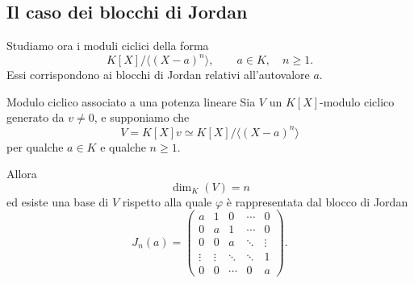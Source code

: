 \documentclass[a4paper]{article}
\begin{document}
\subsection{Il caso dei blocchi di Jordan}

\begin{radioactive}
Studiamo ora i moduli ciclici della forma
\[
    K[X]/\langle (X-a)^n \rangle,
    \qquad
    a\in K,
    \quad
    n\geq 1.
\]
Essi corrispondono ai blocchi di Jordan relativi all'autovalore \(a\).
\end{radioactive}

\begin{radioactive}
\begin{snippetproposition}{Modulo ciclico associato a una potenza lineare}
    Sia \(V\) un \(K[X]\)-modulo ciclico generato da \(v\neq 0\), e supponiamo che
    \[
        V=K[X]v
        \simeq
        K[X]/\langle (X-a)^n \rangle
    \]
    per qualche \(a\in K\) e qualche \(n\geq 1\).

    Allora
    \[
        \dim_K(V)=n
    \]
    ed esiste una base di \(V\) rispetto alla quale \(\varphi\) è rappresentata dal blocco di Jordan
    \[
        J_n(a)
        =
        \begin{pmatrix}
            a & 1 & 0 & \cdots & 0\\
            0 & a & 1 & \cdots & 0\\
            0 & 0 & a & \ddots & \vdots\\
            \vdots & \vdots & \ddots & \ddots & 1\\
            0 & 0 & \cdots & 0 & a
        \end{pmatrix}.
    \]
\end{snippetproposition}
\end{radioactive}
\end{document}
